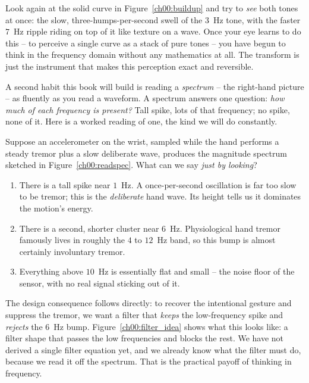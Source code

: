 \begin{happeningbox}
Look again at the solid curve in Figure~\ref{ch00:buildup} and try to \emph{see} both tones at
once: the slow, three-humps-per-second swell of the $3$~Hz tone, with the faster $7$~Hz ripple
riding on top of it like texture on a wave. Once your eye learns to do this -- to perceive a
single curve as a stack of pure tones -- you have begun to think in the frequency domain
without any mathematics at all. The transform is just the instrument that makes this perception
exact and reversible.
\end{happeningbox}

A second habit this book will build is reading a \emph{spectrum} -- the right-hand picture --
as fluently as you read a waveform. A spectrum answers one question: \emph{how much of each
frequency is present?} Tall spike, lots of that frequency; no spike, none of it. Here is a
worked reading of one, the kind we will do constantly.

\begin{example}
Suppose an accelerometer on the wrist, sampled while the hand performs a steady tremor plus a
slow deliberate wave, produces the magnitude spectrum sketched in Figure~\ref{ch00:readspec}.
What can we say \emph{just by looking}?

\begin{enumerate}
  \item There is a tall spike near $1$~Hz. A once-per-second oscillation is far too slow to be
  tremor; this is the \emph{deliberate} hand wave. Its height tells us it dominates the motion's
  energy.
  \item There is a second, shorter cluster near $6$~Hz. Physiological hand tremor famously lives
  in roughly the $4$ to $12$~Hz band, so this bump is almost certainly involuntary tremor.
  \item Everything above $10$~Hz is essentially flat and small -- the noise floor of the sensor,
  with no real signal sticking out of it.
\end{enumerate}

The design consequence follows directly: to recover the intentional gesture and suppress the
tremor, we want a filter that \emph{keeps} the low-frequency spike and \emph{rejects} the
$6$~Hz bump. Figure~\ref{ch00:filter_idea} shows what this looks like: a filter shape that passes the low frequencies and blocks the rest. We have not derived a single filter equation yet, and we already know what the
filter must do, because we read it off the spectrum. That is the practical payoff of thinking in frequency.
\end{example}

